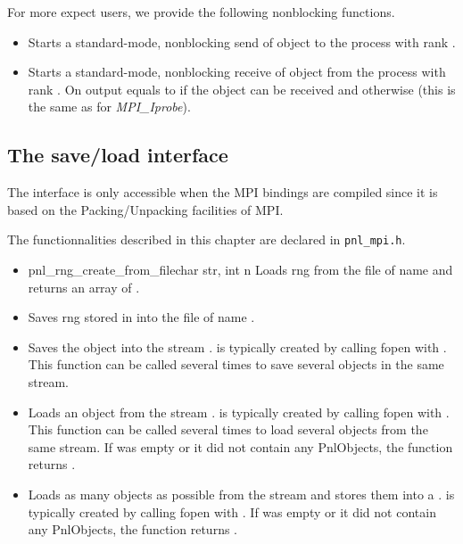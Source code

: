 For more expect users, we provide the following nonblocking functions.
\begin{itemize}
\item {}
  \sshortdescribe Starts a standard-mode, nonblocking send of object
   to the process with rank .
  
  
\item {}
  \sshortdescribe Starts a standard-mode, nonblocking receive of object
   from the process with rank . On output  equals
  to  if the object can be received and  otherwise (this
  is the same as for {\it MPI_Iprobe}).
\end{itemize}

\subsection{The save/load interface}

The interface is only accessible when the MPI bindings are compiled since it
is based on the Packing/Unpacking facilities of MPI.

The functionnalities described in this chapter are declared in \verb!pnl_mpi.h!.
\begin{itemize}
\item {}
  {pnl_rng_create_from_file}{char \ptr str, int n}
  \sshortdescribe Loads  rng from the file of name  and
  returns an array of  .
\item {}
    \sshortdescribe Saves  rng stored in  into the file of
  name .
\item {}
  \sshortdescribe Saves the object  into the stream . 
  is typically created by calling fopen with . This function can be
  called several times to save several objects in the same stream.
\item {}
  \sshortdescribe Loads an object from the stream . 
  is typically created by calling fopen with .  This function can be
  called several times to load several objects from the same stream. If 
  was empty or it did not contain any PnlObjects, the function returns .
\item {}
  \sshortdescribe Loads as many objects as possible from the stream  and
  stores them into a .  is typically created by
  calling fopen with . If  was empty or it did not contain
  any PnlObjects, the function returns .
\end{itemize}



